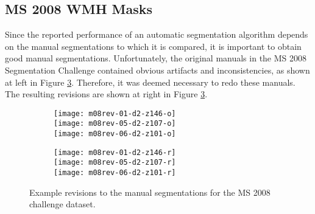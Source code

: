 \subsection{MS 2008 WMH Masks}\label{ss:m08-rev}
Since the reported performance of an automatic segmentation algorithm depends on the manual segmentations to which it is compared, it is important to obtain good manual segmentations. Unfortunately, the original manuals in the MS 2008 Segmentation Challenge contained obvious artifacts and inconsistencies, as shown at left in Figure \ref{fig:m08-rev}. Therefore, it was deemed necessary to redo these manuals. The resulting revisions are shown at right in Figure \ref{fig:m08-rev}.
\begin{figure}
  \centering
  \begin{minipage}{6cm}
    \begin{subfigure}{\textwidth}
      \centering{}\label{fig:m08-rev-o}
      \texttt{[image: m08rev-01-d2-z146-o]}\\[0.2em]
      \texttt{[image: m08rev-05-d2-z107-o]}\\[0.2em]
      \texttt{[image: m08rev-06-d2-z101-o]}
    \end{subfigure}
  \end{minipage}
  \begin{minipage}{6cm}
    \begin{subfigure}{\textwidth}
      \centering{}\label{fig:m08-rev-r}
      \texttt{[image: m08rev-01-d2-z146-r]}\makebox[0pt][r]{\textcolor{white}{ CHB 01 }}\\[0.2em]
      \texttt{[image: m08rev-05-d2-z107-r]}\makebox[0pt][r]{\textcolor{white}{ CHB 05 }}\\[0.2em]
      \texttt{[image: m08rev-06-d2-z101-r]}\makebox[0pt][r]{\textcolor{white}{ CHB 06 }}
    \end{subfigure}
  \end{minipage}
  \caption{Example revisions to the manual segmentations for the MS 2008 challenge dataset.}
  \label{fig:m08-rev}
\end{figure}
